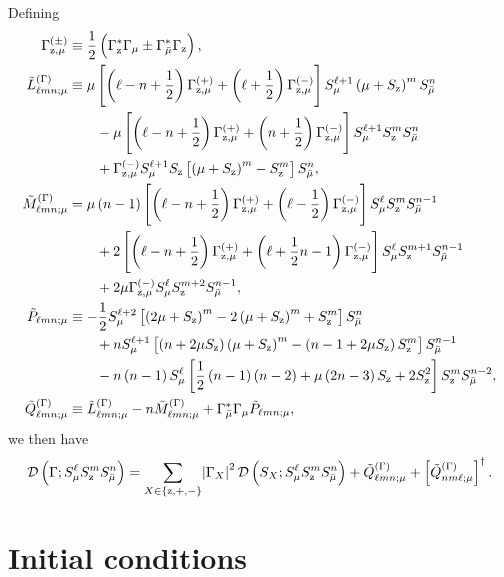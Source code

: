 \documentclass[aps,notitlepage,nofootinbib,11pt]{revtex4-1}
\newcommand{\f}[2]{\dfrac{#1}{#2}} %
\newcommand{\p}[1]{\left(#1\right)} %
\renewcommand{\sp}[1]{\left[#1\right]} %
\renewcommand{\set}[1]{\left\{#1\right\}} %
\newcommand{\D}{\mathcal{D}}
\newcommand{\z}{\text{z}}
\newcommand{\bmu}{{\bar\mu}}
\newcommand{\1}{\mathds{1}}
\begin{document}
Defining
\begin{align}
  \Gamma_{\z,\mu}^{(\pm)}
  &\equiv \f12\p{\Gamma_\z^* \Gamma_\mu \pm \Gamma_\bmu^* \Gamma_\z},
  \allowdisplaybreaks \\
  \tilde L_{\ell mn;\mu}^{(\Gamma)}
  &\equiv \mu \sp{\p{\ell-n+\f12} \Gamma_{\z,\mu}^{(+)}
    + \p{\ell+\f12} \Gamma_{\z,\mu}^{(-)}}
  S_\mu^{\ell+1} \p{\mu+S_\z}^m S_\bmu^n \notag \\
  &\qquad -\mu \sp{\p{\ell-n+\f12} \Gamma_{\z,\mu}^{(+)}
    + \p{n+\f12} \Gamma_{\z,\mu}^{(-)}}
  S_\mu^{\ell+1} S_\z^m S_\bmu^n \notag \\
  &\qquad + \Gamma_{\z,\mu}^{(-)}
  S_\mu^{\ell+1} S_\z \sp{\p{\mu+S_\z}^m - S_\z^m} S_\bmu^n,
  \allowdisplaybreaks \\
  \tilde M_{\ell mn;\mu}^{(\Gamma)}
  &= \mu \p{n-1} \sp{\p{\ell-n+\f12} \Gamma_{\z,\mu}^{(+)}
    + \p{\ell-\f12} \Gamma_{\z,\mu}^{(-)}}
  S_\mu^\ell S_\z^m S_\bmu^{n-1} \notag \\
  &\qquad + 2 \sp{\p{\ell-n+\f12} \Gamma_{\z,\mu}^{(+)}
    + \p{\ell+\f12n-1} \Gamma_{\z,\mu}^{(-)}}
  S_\mu^\ell S_\z^{m+1} S_\bmu^{n-1} \notag \\
  &\qquad + 2\mu \Gamma_{\z,\mu}^{(-)} S_\mu^\ell S_\z^{m+2} S_\bmu^{n-1},
  \allowdisplaybreaks \\
  \tilde P_{\ell mn;\mu}
  &\equiv -\f12 S_\mu^{\ell+2}
  \sp{\p{2\mu+S_\z}^m - 2\p{\mu+S_\z}^m + S_\z^m} S_\bmu^n \notag \\
  &\qquad + n S_\mu^{\ell+1} \sp{\p{n+2\mu S_\z} \p{\mu+S_\z}^m
    - \p{n-1+2\mu S_\z} S_\z^m} S_\bmu^{n-1} \notag \\
  &\qquad -n\p{n-1} S_\mu^\ell
  \sp{\f12\p{n-1}\p{n-2} + \mu\p{2n-3} S_\z + 2 S_\z^2}
  S_\z^m S_\bmu^{n-2},
  \allowdisplaybreaks \\
  \tilde Q_{\ell mn;\mu}^{(\Gamma)}
  &\equiv \tilde L_{\ell mn;\mu}^{(\Gamma)}
  - n \tilde M_{\ell mn;\mu}^{(\Gamma)}
  + \Gamma_\bmu^* \Gamma_\mu \tilde P_{\ell mn;\mu},
\end{align}
we then have
\begin{align}
  \D\p{\Gamma; S_\mu^\ell S_\z^m S_\bmu^n}
  = \sum_{X\in\set{\z,+,-}} \abs{\Gamma_X}^2
  \D\p{S_X; S_\mu^\ell S_\z^m S_\bmu^n}
  + \tilde Q_{\ell mn;\mu}^{(\Gamma)}
  + \sp{\tilde Q_{nm\ell;\mu}^{(\Gamma)}}^\dag.
\end{align}


\section{Initial conditions}
\label{sec:initial_conditions}
\end{document}
